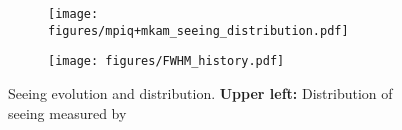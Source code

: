 \begin{figure*}
\begin{subfigure}{0.99\textwidth}
    \centering
    \texttt{[image: figures/mpiq+mkam\_seeing\_distribution.pdf]}
    \label{fig:mpiq_mkamiq}
\end{subfigure}
\newline
\begin{subfigure}{0.99\textwidth}
    \centering
    \texttt{[image: figures/FWHM\_history.pdf]}
    \label{fig:fwhm_history}
\end{subfigure}
\caption{Seeing evolution and distribution. \textbf{Upper left:}  %
Distribution of seeing measured by %
}
\end{figure*}
